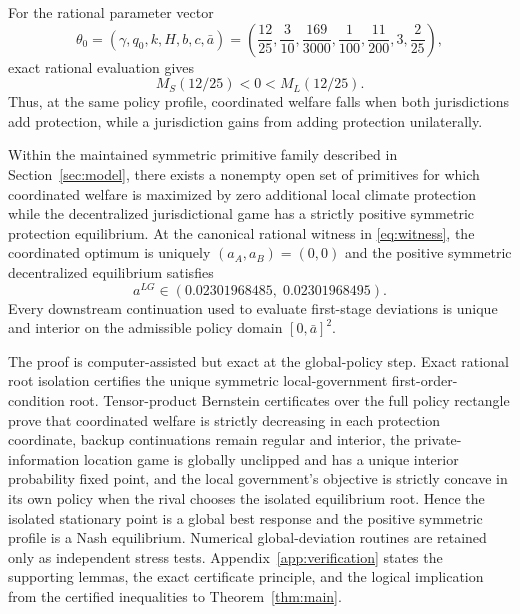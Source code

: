 For the rational parameter vector
\begin{equation}
\theta_0=
\left(
\gamma,q_0,k,H,b,c,\bar a
\right)
=
\left(
\frac{12}{25},\frac3{10},\frac{169}{3000},\frac1{100},\frac{11}{200},3,\frac2{25}
\right),
\label{eq:witness}
\end{equation}
exact rational evaluation gives
\begin{equation}
M_S(12/25)<0<M_L(12/25).
\label{eq:marginal-conflict}
\end{equation}
Thus, at the same policy profile, coordinated welfare falls when both jurisdictions add protection, while a jurisdiction gains from adding protection unilaterally.

\begin{theorem}\label{thm:main}
Within the maintained symmetric primitive family described in Section~\ref{sec:model}, there exists a nonempty open set of primitives for which coordinated welfare is maximized by zero additional local climate protection while the decentralized jurisdictional game has a strictly positive symmetric protection equilibrium. At the canonical rational witness in \eqref{eq:witness}, the coordinated optimum is uniquely $(a_A,a_B)=(0,0)$ and the positive symmetric decentralized equilibrium satisfies
\begin{equation}
a^{LG}\in(0.02301968485,\;0.02301968495).
\label{eq:alg-interval}
\end{equation}
Every downstream continuation used to evaluate first-stage deviations is unique and interior on the admissible policy domain $[0,\bar a]^2$.
\end{theorem}

The proof is computer-assisted but exact at the global-policy step. Exact rational root isolation certifies the unique symmetric local-government first-order-condition root. Tensor-product Bernstein certificates over the full policy rectangle prove that coordinated welfare is strictly decreasing in each protection coordinate, backup continuations remain regular and interior, the private-information location game is globally unclipped and has a unique interior probability fixed point, and the local government's objective is strictly concave in its own policy when the rival chooses the isolated equilibrium root. Hence the isolated stationary point is a global best response and the positive symmetric profile is a Nash equilibrium. Numerical global-deviation routines are retained only as independent stress tests. Appendix~\ref{app:verification} states the supporting lemmas, the exact certificate principle, and the logical implication from the certified inequalities to Theorem~\ref{thm:main}.

